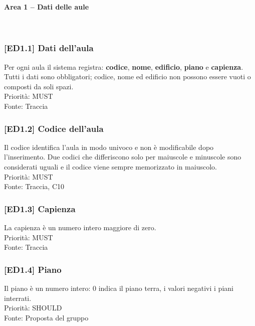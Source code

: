\paragraph{Area 1 – Dati delle aule}~\\
\subsubsection{[ED1.1] Dati dell'aula}
Per ogni aula il sistema registra: \textbf{codice}, \textbf{nome}, \textbf{edificio}, \textbf{piano} e \textbf{capienza}. Tutti i dati sono obbligatori; codice, nome ed edificio non possono essere vuoti o composti da soli spazi.\\
Priorità: MUST\\Fonte: Traccia

\subsubsection{[ED1.2] Codice dell'aula}
Il codice identifica l'aula in modo univoco e non è modificabile dopo l'inserimento. Due codici che differiscono solo per maiuscole e minuscole sono considerati uguali e il codice viene sempre memorizzato in maiuscolo.\\
Priorità: MUST\\Fonte: Traccia, C10

\subsubsection{[ED1.3] Capienza}
La capienza è un numero intero maggiore di zero.\\
Priorità: MUST\\Fonte: Traccia

\subsubsection{[ED1.4] Piano}
Il piano è un numero intero: 0 indica il piano terra, i valori negativi i piani interrati.\\
Priorità: SHOULD\\Fonte: Proposta del gruppo
